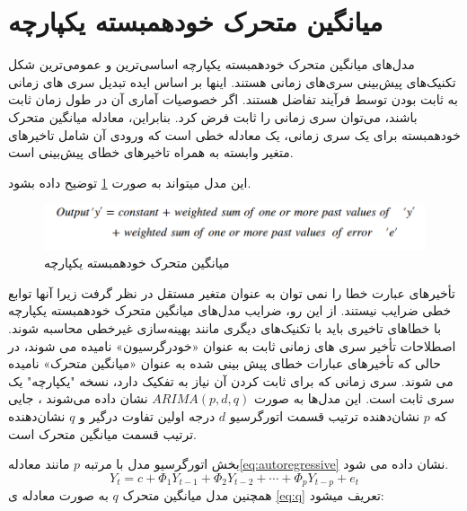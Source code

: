 \section{میانگین متحرک خودهمبسته یکپارچه\protect{}}
مدل‌های میانگین متحرک خودهمبسته یکپارچه اساسی‌ترین و عمومی‌ترین شکل تکنیک‌های پیش‌بینی سری‌های زمانی هستند. اینها بر اساس ایده تبدیل سری های زمانی به ثابت بودن توسط فرآیند تفاضل هستند. اگر خصوصیات آماری آن در طول زمان ثابت باشند، می‌توان سری زمانی را ثابت فرض کرد. بنابراین، معادله میانگین متحرک خودهمبسته  برای یک سری زمانی، یک معادله خطی است که ورودی آن شامل تاخیرهای متغیر وابسته به همراه تاخیرهای خطای پیش‌بینی است.

این مدل میتواند به صورت \ref{fig:ARIMA} توضیح داده بشود.

\begin{figure}[ht!]
    \begin{center}
        \includegraphics[width=12cm]{images/ARIMA.png}
    \end{center}
    \caption[میانگین متحرک خودهمبسته یکپارچه]{میانگین متحرک خودهمبسته یکپارچه}
    \label{fig:ARIMA}
    \end{figure}

    \noindent
    تأخیرهای عبارت خطا را نمی توان به عنوان متغیر مستقل در نظر گرفت زیرا آنها توابع خطی ضرایب نیستند. از این رو، ضرایب مدل‌های میانگین متحرک خودهمبسته یکپارچه 
    با خطاهای تاخیری باید با تکنیک‌های دیگری مانند بهینه‌سازی غیرخطی محاسبه شوند. اصطلاحات تأخیر سری های زمانی ثابت به عنوان «خودرگرسیون» نامیده می شوند، 
    در حالی که تأخیرهای عبارات خطای پیش بینی شده به عنوان «میانگین متحرک» نامیده می شوند. سری زمانی که برای ثابت کردن آن نیاز به تفکیک دارد،
     نسخه "یکپارچه" یک سری ثابت است.
     این مدل‌ها به صورت $ARIMA (p,d,q)$ نشان داده می‌شوند
    ، جایی که $p$ نشان‌دهنده ترتیب قسمت اتورگرسیو $d$ درجه اولین تفاوت درگیر و $q$ نشان‌دهنده ترتیب قسمت میانگین متحرک است.

    بخش اتورگرسیو مدل با مرتبه $p$ مانند معادله\ref*{eq:autoregressive} نشان داده می شود.
    \begin{equation}\label{eq:autoregressive}
        Y_t = c + \Phi_1 Y_{t-1} + \Phi_2 Y_{t-2} + \cdots + \Phi_p Y_{t-p} + e_t
    \end{equation}
    همچنین مدل میانگین متحرک $q$ به صورت معادله ی \ref{eq:q} تعریف میشود:
    
